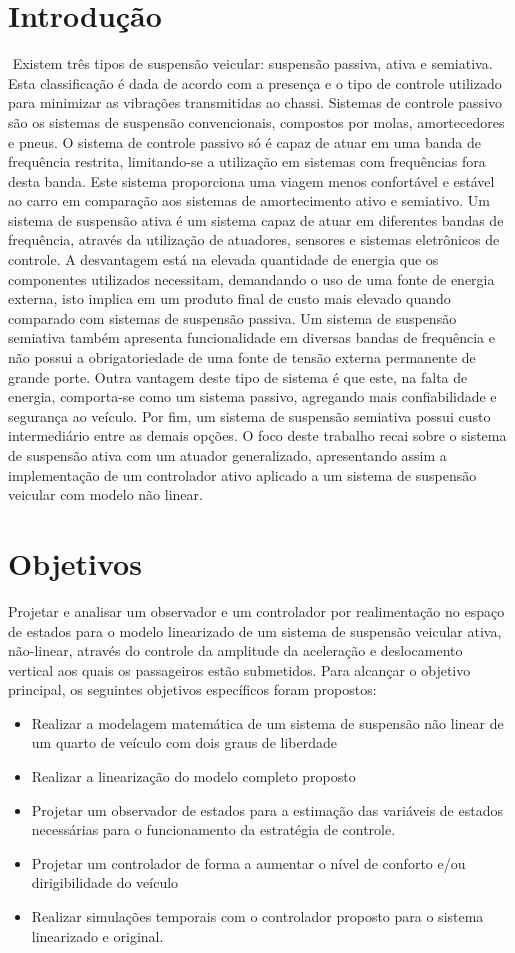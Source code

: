 \documentclass[a4paper]{ifacconf}
\begin{document}
    \section{Introdução}
   $ $
    Existem três tipos de suspensão veicular: suspensão passiva, ativa e semiativa. Esta classificação é dada de acordo com a presença e o tipo de controle utilizado para minimizar as vibrações transmitidas ao chassi.
    Sistemas de controle passivo são os sistemas de suspensão convencionais, compostos por molas, amortecedores e pneus. O sistema de controle passivo só é capaz de atuar em uma banda de frequência restrita, limitando-se a utilização em sistemas com frequências fora desta banda. Este sistema proporciona uma viagem menos confortável e estável ao carro em comparação aos sistemas de amortecimento ativo e semiativo.
    Um sistema de suspensão ativa é um sistema capaz de atuar em diferentes bandas de frequência, através da utilização de atuadores, sensores e sistemas eletrônicos de controle. A desvantagem está na elevada quantidade de energia que os componentes utilizados necessitam, demandando o uso de uma fonte de energia externa, isto implica em um produto final de custo mais elevado quando comparado com sistemas de suspensão passiva.
    Um sistema de suspensão semiativa também apresenta funcionalidade em diversas bandas de frequência e não possui a obrigatoriedade de uma fonte de tensão externa permanente de grande porte. Outra vantagem deste tipo de sistema é que este, na falta de energia, comporta-se como um sistema passivo, agregando mais confiabilidade e segurança ao veículo. Por fim, um sistema de suspensão semiativa possui custo intermediário entre as demais opções.
    O foco deste trabalho recai sobre o sistema de suspensão ativa com um atuador generalizado, apresentando assim a implementação de um controlador ativo aplicado a um sistema de suspensão veicular com modelo não linear.
    \section{Objetivos}
    Projetar e analisar um observador e um controlador por realimentação no espaço de estados para o modelo linearizado de um sistema de suspensão veicular ativa, não-linear, através do controle da amplitude da aceleração e deslocamento vertical aos quais os passageiros estão submetidos.     
    Para alcançar o objetivo principal, os seguintes objetivos específicos foram propostos:
    \begin{itemize}
        \item Realizar a modelagem matemática de um sistema de suspensão não linear de um quarto de veículo com dois graus de liberdade
        \item Realizar a linearização do modelo completo proposto
        \item Projetar um observador de estados para a estimação das variáveis de estados necessárias para o funcionamento da estratégia de controle.
        \item Projetar um controlador de forma a aumentar o nível de conforto e/ou dirigibilidade do veículo
        \item Realizar simulações temporais com o controlador proposto para o sistema linearizado e original.
    \end{itemize}
\end{document}
